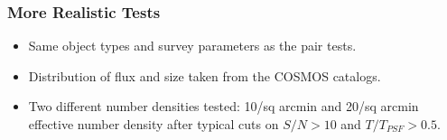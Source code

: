 \documentclass{beamer}
\begin{document}
\frame
{
    \frametitle{More Realistic Tests}

 
    \begin{itemize}

        \item Same object types and survey parameters as the pair tests.

        \item Distribution of flux and size taken from the COSMOS catalogs.

        \item Two different number densities tested: 10/sq arcmin and 20/sq
            arcmin effective number density after typical cuts on $S/N > 10$
            and $T/T_{PSF} > 0.5$.

    \end{itemize}

}
\end{document}
